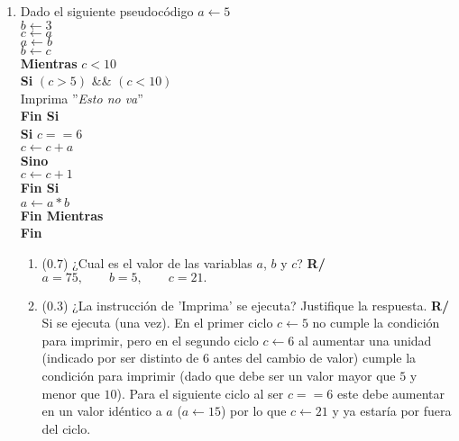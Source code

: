 \documentclass[12pt]{article}
\begin{document}
  \begin{enumerate}[leftmargin=*,widest=9]
    \item Dado el siguiente pseudocódigo
\(a\gets 5\)\\
\(b\gets 3\)\\
\(c\gets a\)\\
\(a\gets b\)\\
\(b\gets c\)\\
\textbf{Mientras} \(c < 10\)\\
\hspace*{1cm}\textbf{Si} \((c > 5)\) \&\& \((c < 10)\)\\
\hspace*{1cm}\hspace*{1cm}Imprima ''\textit{Esto no va}''\\
\hspace*{1cm}\textbf{Fin Si}\\
\hspace*{1cm}\textbf{Si} \(c == 6\)\\
\hspace*{1cm}\hspace*{1cm}\(c \gets c + a\)\\
\hspace*{1cm}\textbf{Sino}\\
\hspace*{1cm}\hspace*{1cm}\(c \gets c + 1\)\\
\hspace*{1cm}\textbf{Fin Si}\\
\hspace*{1cm}\(a \gets a * b\)\\
\textbf{Fin Mientras}\\
\textbf{Fin}\\
\vspace{-.5cm}
    \begin{enumerate}[label=\alph*]
    \item (\(0.7\)) ¿Cual es el valor de las variablas \(a\), \(b\) y \(c\)?
    \textbf{R/} \(a = 75, \qquad b=5, \qquad c=21. \)
    \item (\(0.3\)) ¿La instrucción de 'Imprima' se ejecuta? Justifique la respuesta.
    \textbf{R/} Si se ejecuta (una vez). En el primer ciclo \(c \gets 5\) no cumple la condición para imprimir, pero en el segundo ciclo \(c \gets 6\) al aumentar una unidad (indicado por ser distinto de \(6\) antes del cambio de valor) cumple la condición para imprimir (dado que debe ser un valor mayor que \(5\) y menor que \(10\)). Para el siguiente ciclo al ser \(c== 6\) este debe aumentar en un valor idéntico a \(a\) (\(a \gets 15\)) por lo que \(c \gets 21\) y ya estaría por fuera del ciclo.

\end{enumerate}
\end{enumerate}
\end{document}
